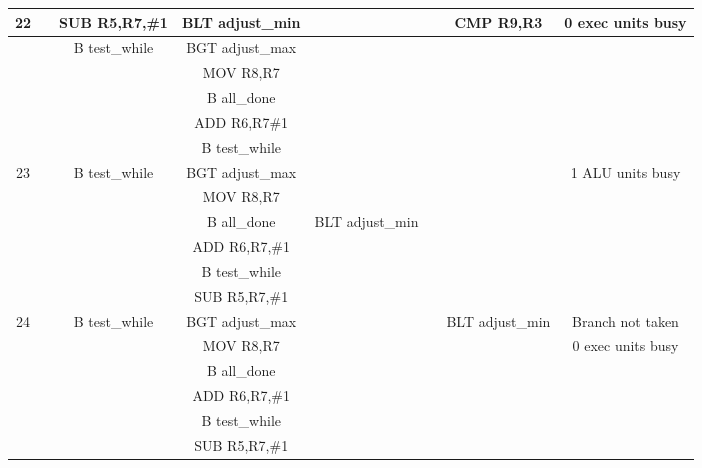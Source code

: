 \documentclass{article}
\begin{document}
{\begin{landscape}
\begin{longtable}{|c|c|c|c|c:c|c|c|}
    22 & & SUB R5,R7,\#1 & BLT adjust\_min & & & CMP R9,R3 & 0 exec units busy \\ \hline
     & & B test\_while & BGT adjust\_max & & & & \\ \hline
     & & & MOV R8,R7 & &  & & \\ \hline
     &  &  & B all\_done & &  & & \\ \hline
     &  &  & ADD R6,R7\#1 &  &  &  & \\ \hline
     &  &  & B test\_while &  &  &  & \\ \hline \hline
     
    23 & & B test\_while & BGT adjust\_max & & & & 1 ALU units busy \\ \hline
     & & & MOV R8,R7 & & & & \\ \hline
     & & &  B all\_done & BLT adjust\_min &  & & \\ \hline
     &  &  & ADD R6,R7,\#1 & &  & & \\ \hline
     &  &  & B test\_while &  &  &  & \\ \hline
     &  &  & SUB R5,R7,\#1 &  &  &  & \\ \hline \hline

    24 & & B test\_while & BGT adjust\_max & & & BLT adjust\_min & Branch not taken \\ \hline
     & & & MOV R8,R7 & & & & 0 exec units busy \\ \hline
     & & &  B all\_done & &  & & \\ \hline
     &  &  & ADD R6,R7,\#1 & &  & & \\ \hline
     &  &  & B test\_while &  &  &  & \\ \hline
     &  &  & SUB R5,R7,\#1 &  &  &  & \\ \hline \hline
     

\end{longtable}
\end{landscape}}
\end{document}
